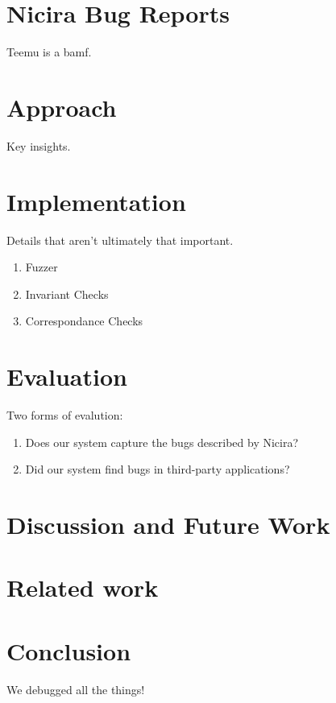 \documentclass{sig-alternate-10pt}
\begin{document}
\section{Nicira Bug Reports}

Teemu is a bamf.

\section{Approach}

Key insights.

\section{Implementation}

Details that aren't ultimately that important.

\begin{enumerate}
\item Fuzzer
\item Invariant Checks
\item Correspondance Checks
\end{enumerate}

\section{Evaluation}

Two forms of evalution:

\begin{enumerate}
\item Does our system capture the bugs described by Nicira?
\item Did our system find bugs in third-party applications?
\end{enumerate}

\section{Discussion and Future Work}
    \label{sec:future_work}
    

\section{Related work}
\label{sec:related_work}


\section{Conclusion}

We debugged all the things!




%
\end{document}
